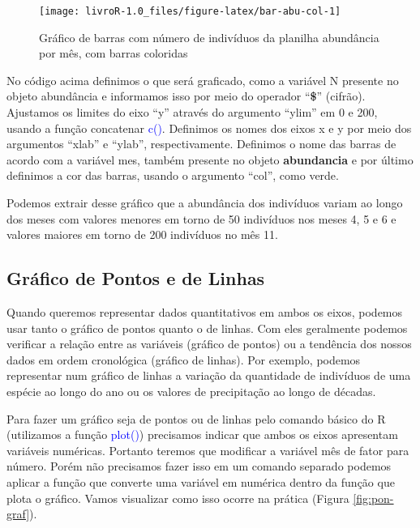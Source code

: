 \documentclass[14pt,titlepage, oneside, openany, a4paper]{book}
\begin{document}
\begin{figure}[H]

{\centering \texttt{[image: livroR-1.0\_files/figure-latex/bar-abu-col-1]} 

}

\caption{Gráfico de barras com número de indivíduos da planilha abundância por mês, com barras coloridas}\label{fig:bar-abu-col}
\end{figure}

No código acima definimos o que será graficado, como a variável N presente no objeto abundância e informamos isso por meio do operador ``\textbf{\$}'' (cifrão). Ajustamos os limites do eixo ``y'' através do argumento ``ylim'' em 0 e 200, usando a função concatenar \textcolor{blue}{c()}. Definimos os nomes dos eixos x e y por meio dos argumentos ``xlab'' e ``ylab'', respectivamente. Definimos o nome das barras de acordo com a variável mes, também presente no objeto \textbf{abundancia} e por último definimos a cor das barras, usando o argumento ``col'', como verde.

Podemos extrair desse gráfico que a abundância dos indivíduos variam ao longo dos meses com valores menores em torno de 50 indivíduos nos meses 4, 5 e 6 e valores maiores em torno de 200 indivíduos no mês 11.

\hypertarget{gruxe1fico-de-pontos-e-de-linhas}{%
\subsection{Gráfico de Pontos e de Linhas}\label{gruxe1fico-de-pontos-e-de-linhas}}

Quando queremos representar dados quantitativos em ambos os eixos, podemos usar tanto o gráfico de pontos quanto o de linhas. Com eles geralmente podemos verificar a relação entre as variáveis (gráfico de pontos) ou a tendência dos nossos dados em ordem cronológica (gráfico de linhas). Por exemplo, podemos representar num gráfico de linhas a variação da quantidade de indivíduos de uma espécie ao longo do ano ou os valores de precipitação ao longo de décadas.

Para fazer um gráfico seja de pontos ou de linhas pelo comando básico do R (utilizamos a função \textcolor{blue}{plot()}) precisamos indicar que ambos os eixos apresentam variáveis numéricas. Portanto teremos que modificar a variável mês de fator para número. Porém não precisamos fazer isso em um comando separado podemos aplicar a função que converte uma variável em numérica dentro da função que plota o gráfico. Vamos visualizar como isso ocorre na prática (Figura \ref{fig:pon-graf}).
\end{document}

